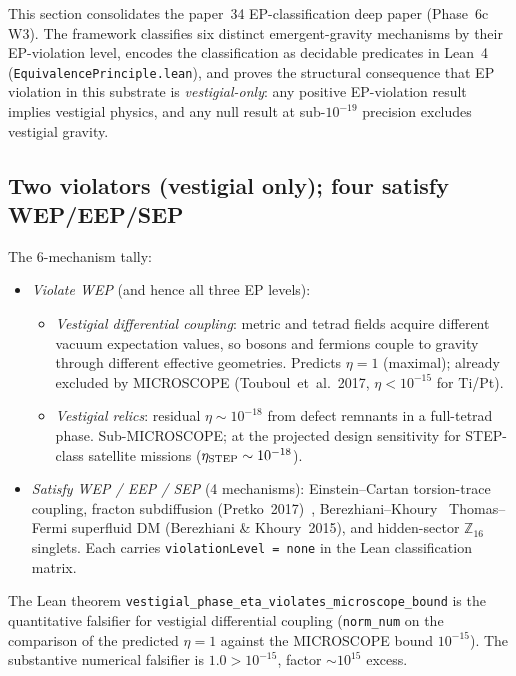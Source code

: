 \documentclass[aps,prd,reprint,nofootinbib,superscriptaddress]{revtex4-2}
\begin{document}
This section consolidates the paper~34 EP-classification deep paper
(Phase~6c W3). The framework classifies six distinct emergent-gravity
mechanisms by their EP-violation level, encodes the classification as
decidable predicates in Lean~4~\cite{Lean4,Mathlib} (\texttt{EquivalencePrinciple.lean}),
and proves the structural
consequence that EP violation in this substrate is
\emph{vestigial-only}: any positive EP-violation result implies vestigial
physics, and any null result at sub-$10^{-19}$ precision excludes
vestigial gravity.

\subsection{Two violators (vestigial only); four satisfy WEP/EEP/SEP}
\label{subsec:ep-tally}

The 6-mechanism tally:

\begin{itemize}
\item \emph{Violate WEP} (and hence all three EP levels):
  \begin{itemize}
  \item \emph{Vestigial differential coupling}: metric and tetrad
    fields acquire different vacuum expectation values, so bosons and
    fermions couple to gravity through different effective geometries.
    Predicts $\eta = 1$ (maximal); already excluded by MICROSCOPE
    (Touboul~et~al.~2017, $\eta < 10^{-15}$ for Ti/Pt).
  \item \emph{Vestigial relics}: residual $\eta \sim 10^{-18}$ from
    defect remnants in a full-tetrad phase. Sub-MICROSCOPE; at the
    projected design sensitivity for STEP-class satellite missions
    ($\eta_{\rm STEP} \sim 10^{-18}$).
  \end{itemize}
\item \emph{Satisfy WEP / EEP / SEP} (4 mechanisms):
  Einstein--Cartan torsion-trace coupling, fracton subdiffusion
  (Pretko~2017)~\cite{Pretko2017,Glodkowski2024}, Berezhiani--Khoury~\cite{Berezhiani2015,BK2025} Thomas--Fermi superfluid DM
  (Berezhiani \& Khoury~2015), and hidden-sector $\mathbb{Z}_{16}$
  singlets. Each carries \texttt{violationLevel = none} in the
  Lean classification matrix.
\end{itemize}

The Lean theorem
\texttt{vestigial\_phase\_eta\_violates\_microscope\_bound} is the
quantitative falsifier for vestigial differential coupling
(\texttt{norm\_num} on the comparison of the predicted $\eta = 1$
against the MICROSCOPE bound $10^{-15}$). The substantive numerical
falsifier is $1.0 > 10^{-15}$, factor $\sim 10^{15}$ excess.
\end{document}
